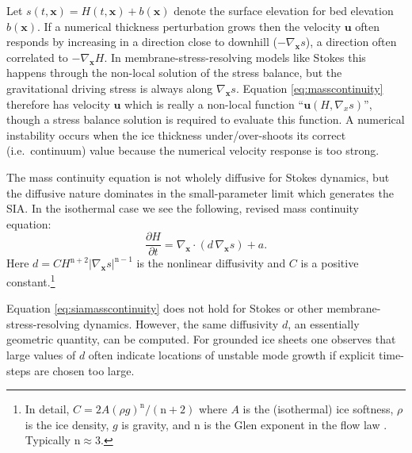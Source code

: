 \documentclass[twocolumn,letterpaper]{igs}
\newcommand\bu{\mathbf{u}}
\newcommand\bx{\mathbf{x}}
\newcommand{\grad}{\nabla}
\newcommand{\Divx}{\nabla_\bx \cdot}
\newcommand{\gradx}{\nabla_\bx}
\begin{document}
Let $s(t,\bx)=H(t,\bx)+b(\bx)$ denote the surface elevation for bed elevation $b(\bx)$.  If a numerical thickness perturbation grows then the velocity $\bu$ often responds by increasing in a direction close to downhill ($-\gradx s$), a direction often correlated to $-\gradx H$.  In membrane-stress-resolving models like Stokes this happens through the non-local solution of the stress balance, but the gravitational driving stress is always along $\gradx s$.  Equation \eqref{eq:masscontinuity} therefore has velocity $\bu$ which is really a non-local function ``$\bu(H,\grad_x s)$'', though a stress balance solution is required to evaluate this function.  A numerical instability occurs when the ice thickness under/over-shoots its correct (i.e.~continuum) value because the numerical velocity response is too strong.

\newcommand{\nn}{\text{n}}
The mass continuity equation is not wholely diffusive for Stokes dynamics, but the diffusive nature dominates in the small-parameter limit which generates the SIA.  In the isothermal case we see the following, revised mass continuity equation:
\begin{equation}
\frac{\partial H}{\partial t} = \Divx \left(d\, \gradx s \right) + a. \label{eq:siamasscontinuity}
\end{equation}
Here $d = C H^{\nn+2} |\gradx s|^{\nn-1}$ is the nonlinear diffusivity and $C$ is a positive constant.\footnote{In detail, $C = 2 A (\rho g)^\nn/(\nn+2)$ where $A$ is the (isothermal) ice softness, $\rho$ is the ice density, $g$ is gravity, and $\nn$ is the Glen exponent in the flow law \citep{GreveBlatter2009}.  Typically $\nn\approx 3$.}

Equation \eqref{eq:siamasscontinuity} does not hold for Stokes or other membrane-stress-resolving dynamics.  However, the same diffusivity $d$, an essentially geometric quantity, can be computed.  For grounded ice sheets one observes that large values of $d$ often indicate locations of unstable mode growth if explicit time-steps are chosen too large.
\end{document}
